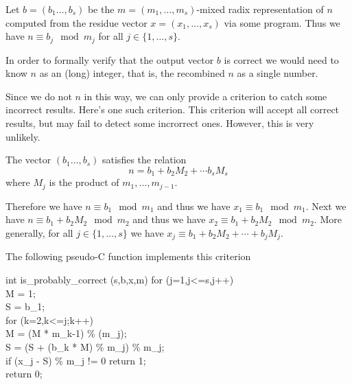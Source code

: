 \documentclass[10pt]{report}
\begin{document}
Let $b = (b_1 \ldots, b_s)$ be the $m = (m_1, \ldots, m_s)$-mixed radix 
representation of $n$ computed from the residue vector 
$x = (x_1, \ldots, x_s)$ via some program.
Thus we have $n \equiv b_j \mod{m_j}$ for all $j \in \{ 1, \ldots, s \}$.

In order to formally verify that the output vector 
$b$ is correct we would need to know $n$ as an (long) integer,
that is, the recombined $n$ as a single number.

Since we do not $n$ in this way, we can only provide a criterion
to catch some incorrect results. Here's one such criterion.
This criterion will accept all correct results, but may
fail to detect some incrorrect ones. However, this is very unlikely.


The vector $(b_1 \ldots, b_s)$ satisfies the relation
\begin{equation*}
n = b_1 + b_2 M_2 + \cdots b_s M_s
\end{equation*}
where $M_j$ is the product of $m_1,\ldots,m_{j-1}$.

Therefore we have
$n \equiv b_1 \mod{m_1}$ and thus we have
$x_1 \equiv b_1 \mod{m_1}$.
Next we have
$n \equiv b_1 + b_2 M_2 \mod{m_2}$ and thus we have
$x_2 \equiv b_1 + b_2 M_2  \mod{m_2}$.
More generally, for all $j \in \{ 1, \ldots, s \}$ we have
$x_j  \equiv b_1 + b_2 M_2 + \cdots + b_j M_j$.

The following pseudo-C function implements this criterion

int is\_probably\_correct (s,b,x,m)
{
    for (j=1,j<=s,j++) { \\
        M = 1;\\
        S = b\_1;\\
        for (k=2,k<=j;k++) {\\
           M = (M * m\_{k-1}) \% (m\_j);\\
           S  = (S + (b\_k * M) \% m\_j) \% m\_j;
        }\\
        if (x\_j - S) \% m\_j != 0 {  return 1; }\\
     }
     return 0;
}
\end{document}
